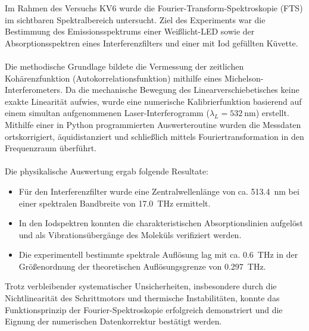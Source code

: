 \documentclass[10pt,a4paper]{article}
\begin{document}
Im Rahmen des Versuchs KV6 wurde die Fourier-Transform-Spektroskopie (FTS) im sichtbaren Spektralbereich untersucht. Ziel des Experiments war die Bestimmung des Emissionsspektrums einer Weißlicht-LED sowie der Absorptionsspektren eines Interferenzfilters und einer mit Iod gefüllten Küvette.\\\\
Die methodische Grundlage bildete die Vermessung der zeitlichen Kohärenzfunktion (Autokorrelationsfunktion) mithilfe eines Michelson-Interferometers. Da die mechanische Bewegung des Linearverschiebetisches keine exakte Linearität aufwies, wurde eine numerische Kalibrierfunktion basierend auf einem simultan aufgenommenen Laser-Interferogramm ($\lambda_L=\qty{532}{\nm}$) erstellt. Mithilfe einer in Python programmierten Auswerteroutine wurden die Messdaten ortskorrigiert, äquidistanziert und schließlich mittels Fouriertransformation in den Frequenzraum überführt.\\\\
Die physikalische Auswertung ergab folgende Resultate:
\begin{itemize}
       \item Für den Interferenzfilter wurde eine Zentralwellenlänge von ca. \qty{513,4}{\nm} bei einer spektralen Bandbreite von \qty{17,0}{\tera\hertz} ermittelt.
       \item In den Iodspektren konnten die charakteristischen Absorptionslinien aufgelöst und als Vibrationsübergänge des Moleküls verifiziert werden.
       \item Die experimentell bestimmte spektrale Auflösung lag mit ca. \qty{0,6}{\tera\hertz} in der Größenordnung der theoretischen Auflösungsgrenze von \qty{0,297}{\tera\hertz}.
\end{itemize}
Trotz verbleibender systematischer Unsicherheiten, insbesondere durch die Nichtlinearität des Schrittmotors und thermische Instabilitäten, konnte das Funktionsprinzip der Fourier-Spektroskopie erfolgreich demonstriert und die Eignung der numerischen Datenkorrektur bestätigt werden.

\newpage
{}





\newpage

\listoffigures %

\newpage
\end{document}
